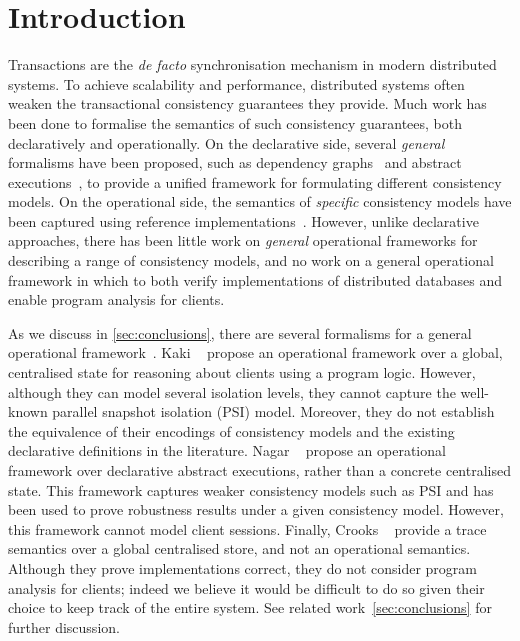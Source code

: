 \section{Introduction}
Transactions are the \emph{de facto} synchronisation mechanism in modern distributed systems.
To achieve scalability and performance, distributed systems often weaken the transactional consistency guarantees they provide. 
%
%
Much work has been done to formalise the semantics of such consistency guarantees, both
declaratively and operationally.
On the declarative side, several \emph{general} formalisms have been proposed, 
such as dependency graphs~\cite{adya} and abstract executions~\cite{framework-concur}, to provide a unified
framework for formulating different consistency models.  
On the operational side, the semantics of \emph{specific} consistency models have
been captured using reference implementations~\cite{si,PSI,PSI-RA}. 
However, unlike declarative approaches, there has been
little work on \emph{general} operational frameworks for describing a range
of consistency models, and no work on a general operational framework
in which to both verify implementations of distributed databases and 
enable program analysis for clients.

As we discuss in \cref{sec:conclusions}, there are several formalisms for a general operational framework~\cite{sureshConcur,alonetogether,seebelieve}. 
Kaki \etal~\cite{alonetogether} propose an operational framework over a global, centralised state for reasoning about clients using a program logic. 
However, although they can model several isolation levels, they cannot capture the well-known
parallel snapshot isolation (PSI) model. 
Moreover, they do not establish the equivalence of their encodings of consistency models 
and the existing declarative definitions in the literature. 
Nagar \etal~\cite{sureshConcur} propose an operational framework over declarative abstract executions, rather than a concrete centralised state. This framework captures weaker consistency models
such as PSI and has been used to prove robustness results under a given consistency model.  
However, this framework cannot model client sessions.
Finally, Crooks \etal~\cite{seebelieve} provide a trace semantics over a global
centralised store, and not an operational semantics. 
Although they prove implementations correct, they do not consider program analysis for clients;
indeed we believe it would be difficult to do so given their choice to
keep track of the entire system.
See related work~\cref{sec:conclusions} for further discussion. 




